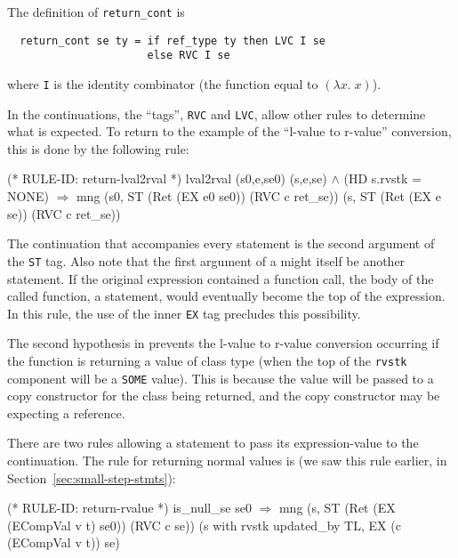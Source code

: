 \documentclass[11pt]{article}
\begin{document}
The definition of \texttt{return_cont} is
\begin{verbatim}
  return_cont se ty = if ref_type ty then LVC I se
                      else RVC I se
\end{verbatim}
where \texttt{I} is the identity combinator (the function equal to
$(\lambda x.\;x)$).

In the continuations, the ``tags'', \texttt{RVC} and \texttt{LVC},
allow other rules to determine what is expected.  To return to the
example of the ``l-value to r-value'' conversion, this is done by the
following rule:
%
%
\begin{stdrule}
(* RULE-ID: return-lval2rval *)
     lval2rval (s0,e,se0) (s,e,se) \(\land\)
     (HD s.rvstk = NONE)
   \(\Rightarrow\)
     mng (s0, ST (Ret (EX e0 se0)) (RVC c ret_se))
         (s, ST (Ret (EX e se)) (RVC c ret_se))
\end{stdrule}
The continuation that accompanies every statement is the second
argument of the \texttt{ST} tag. Also note that the first argument of
a  might itself be another statement.  If the original
expression contained a function call, the body of the called function,
a statement, would eventually become the top of the expression.  In
this rule, the use of the inner \texttt{EX} tag precludes this
possibility.

The second hypothesis in  prevents the
l-value to r-value conversion occurring if the function is returning
a value of class type (when the top of the \texttt{rvstk} component %
%
will be a \texttt{SOME} value).  This is because the value will be
passed to a copy constructor for the class being returned, and the
copy constructor may be expecting a reference.

There are two rules allowing a  statement to pass its
expression-value to the continuation.  The rule for returning normal
values is  (we saw this rule earlier, in
Section~\ref{sec:small-step-stmts}):%
%
\begin{stdrule}
(* RULE-ID: return-rvalue *)
     is_null_se se0
   \(\Rightarrow\)
     mng (s, ST (Ret (EX (ECompVal v t) se0)) (RVC c se))
         (s with rvstk updated_by TL, EX (c (ECompVal v t)) se)

\end{stdrule}
\end{document}

